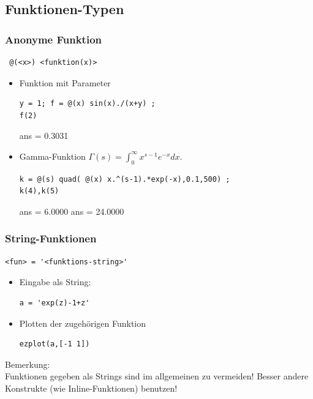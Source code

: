 \documentclass[hyperref={xetex}]{beamer}
\begin{document}
\subsection{Funktionen-Typen}
%
%
\begin{frame}[fragile]\frametitle{Anonyme Funktion}
\begin{lstlisting}
 @(<x>) <funktion(x)>
\end{lstlisting}

\begin{itemize}
\item Funktion mit Parameter
\begin{lstlisting}
y = 1; f = @(x) sin(x)./(x+y) ;
f(2)
\end{lstlisting}
\begin{matlab}
ans =
    0.3031
\end{matlab}

\item Gamma-Funktion $\Gamma(s) = \int_0^\infty x^{s-1} e^{-x} dx$.
\begin{lstlisting}
k = @(s) quad( @(x) x.^(s-1).*exp(-x),0.1,500) ;
k(4),k(5)
\end{lstlisting}
\begin{matlab}
ans =
    6.0000
ans =
   24.0000
\end{matlab}

\end{itemize}
\end{frame}

%
%
\begin{frame}[fragile]\frametitle{String-Funktionen}
\begin{lstlisting}
<fun> = '<funktions-string>' 
\end{lstlisting}

\begin{itemize}
\item Eingabe als String: 
\begin{lstlisting}
a = 'exp(z)-1+z'
\end{lstlisting}
\item Plotten der zugeh\"origen Funktion 
\begin{lstlisting}
ezplot(a,[-1 1]) 
\end{lstlisting}
\end{itemize}
\alert{Bemerkung:} \\
Funktionen gegeben als Strings sind im allgemeinen zu vermeiden!
Besser andere Konstrukte (wie Inline-Funktionen) benutzen!
\end{frame}
\end{document}
